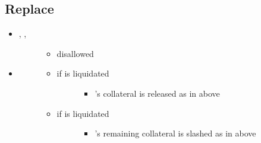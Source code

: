 \documentclass[a4paper,10pt,english]{sphinxmanual}
\begin{document}
\subsection{Replace}
\label{\detokenize{security_performance/liquidations:replace}}\begin{itemize}
\item {} \begin{description}
\item[{, , }] \leavevmode\begin{itemize}
\item {} 
disallowed

\end{itemize}

\end{description}

\item {} \begin{description}
\item[{}] \leavevmode\begin{itemize}
\item {} \begin{description}
\item[{if  is liquidated}] \leavevmode\begin{itemize}
\item {} 
’s collateral is released as in  above

\end{itemize}

\end{description}

\item {} \begin{description}
\item[{if  is liquidated}] \leavevmode\begin{itemize}
\item {} 
’s remaining collateral is slashed as in  above

\end{itemize}

\end{description}

\end{itemize}


\end{description}
\end{itemize}
\end{document}

